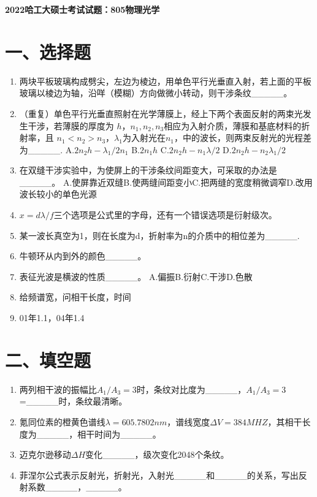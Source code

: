 \documentclass[12pt, a4paper]{article}
\theoremstyle{solution}
\begin{document}
\begin{center}
\Large\textbf{2022哈工大硕士考试试题：805物理光学}
\end{center}





\section*{一、选择题}
\begin{enumerate}
    \item 两块平板玻璃构成劈尖，左边为棱边，用单色平行光垂直入射，若上面的平板玻璃以棱边为轴，沿咩（模糊）方向做微小转动，则干涉条纹\_\_\_\_\_。
    \item （重复）单色平行光垂直照射在光学薄膜上，经上下两个表面反射的两束光发生干涉，若薄膜的厚度为 $h$，$n_1,n_2,n_3$相应为入射介质，薄膜和基底材料的折射率，且 $n_1<n_2>n_3$，$\lambda_1$为入射光在$n_1$，中的波长，则两束反射光的光程差为\_\_\_\_\_.
    A.$2n_2h-\lambda_1/2n_1$ \quad B.$2n_1h$ \quad C.$2n_2h-n_1\lambda /2$ \quad D.$2n_2h-n_2\lambda_1/2$ \quad
    \item 在双缝干涉实验中，为使屏上的干涉条纹间距变大，可采取的办法是\_\_\_\_\_。
    A.使屏靠近双缝\quad B.使两缝间距变小\quad C.把两缝的宽度稍微调窄\quad D.改用波长较小的单色光源
    \item $x=d \lambda/f$三个选项是公式里的字母，还有一个错误选项是衍射级次。
    \item 某一波长真空为1，则在长度为d，折射率为n的介质中的相位差为\_\_\_\_\_.
    \item 牛顿环从内到外的颜色\_\_\_\_\_。
    \item 表征光波是横波的性质\_\_\_\_\_。
    A.偏振\quad B.衍射\quad C.干涉\quad D.色散
    \item 给频谱宽，问相干长度，时间
    \item 01年1.1，04年1.4
\end{enumerate}
\section*{二、填空题}
\begin{enumerate}
    \item 两列相干波的振幅比$A_1/A_3=3$时，条纹对比度为\_\_\_\_\_，$A_1/A_3=3$=\_\_\_\_\_时，条纹最清晰。
    \item 氪同位素的橙黄色谱线$\lambda=605.7802nm$，谱线宽度$\Delta V=384MHZ $，其相干长度为\_\_\_\_\_，相干时间为\_\_\_\_\_。
    \item 迈克尔逊移动$\Delta H$变化\_\_\_\_\_，级次变化2048个条纹。
    \item 菲涅尔公式表示反射光，折射光，入射光\_\_\_\_\_和\_\_\_\_\_的关系，写出反射系数\_\_\_\_\_，\_\_\_\_\_。
\end{enumerate}
\end{document}
